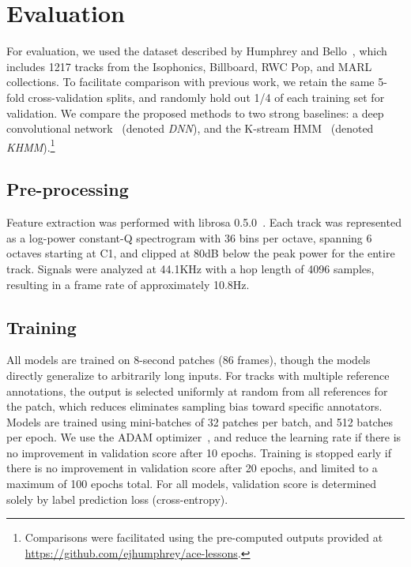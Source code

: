 \documentclass{article}
\begin{document}
\section{Evaluation}

For evaluation, we used the dataset described by Humphrey and Bello~\cite{humphrey2015four}, which includes 1217 tracks from the Isophonics, Billboard, RWC Pop, and MARL collections.
To facilitate comparison with previous work, we retain the same 5-fold cross-validation splits, and randomly hold out 1/4 of each training set for validation.
We compare the proposed methods to two strong baselines: a deep convolutional network~\cite{humphrey2015four} (denoted \emph{DNN}), and the K-stream HMM~\cite{cho2014improved} (denoted \emph{KHMM}).\footnote{Comparisons were facilitated using the pre-computed outputs provided at \url{https://github.com/ejhumphrey/ace-lessons}.}

\subsection{Pre-processing}

Feature extraction was performed with librosa 0.5.0~\cite{librosa050}.
Each track was represented as a log-power constant-Q spectrogram with 36 bins per octave, spanning 6 octaves starting at C1, and clipped at 80dB below the peak power for the entire track.
Signals were analyzed at 44.1KHz with a hop length of 4096 samples, resulting in a frame rate of approximately 10.8Hz.

\subsection{Training}
All models are trained on 8-second patches (86 frames), though the models directly generalize to arbitrarily long inputs.
For tracks with multiple reference annotations, the output is selected uniformly at random from all references for the patch, which reduces eliminates sampling bias toward specific annotators.
Models are trained using mini-batches of 32 patches per batch, and 512 batches per epoch.
We use the ADAM optimizer~\cite{kingma2014adam}, and reduce the learning rate if there is no improvement in validation score after 10 epochs.
Training is stopped early if there is no improvement in validation score after 20 epochs, and limited to a maximum of 100 epochs total.
For all models, validation score is determined solely by label prediction loss (cross-entropy).
\end{document}
